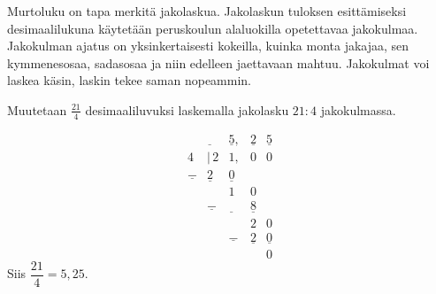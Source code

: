 Murtoluku on tapa merkitä jakolaskua. Jakolaskun tuloksen esittämiseksi desimaalilukuna
käytetään peruskoulun alaluokilla opetettavaa jakokulmaa. Jakokulman ajatus on yksinkertaisesti kokeilla, kuinka monta jakajaa, sen kymmenesosaa, sadasosaa ja niin
edelleen jaettavaan mahtuu. Jakokulmat voi laskea käsin, laskin tekee saman nopeammin.

\begin{esimerkki}
Muutetaan $\frac{21}{4}$ desimaaliluvuksi laskemalla jakolasku $21 : 4$ jakokulmassa.
%
%



\[ 
\begin{array}{cccccc}
 & \underline{ \ \ } & \underline{5}, & \underline{2} & \underline{5} \\
 4 & \!\!|\,2 & 1, & 0 & 0 \\
 \underline{-} & \underline{2}& \underline{0} \\
 & & 1 &0 \\
 & \underline{-} &\underline{ \ \ }  & \underline{8} \\
 & & & 2 & 0 \\
 & & \underline{-} & \underline{2} & \underline{0} \\
 & &  & & 0
\end{array}
\]
Siis $\dfrac{21}{4} = 5,25$.
\end{esimerkki}

